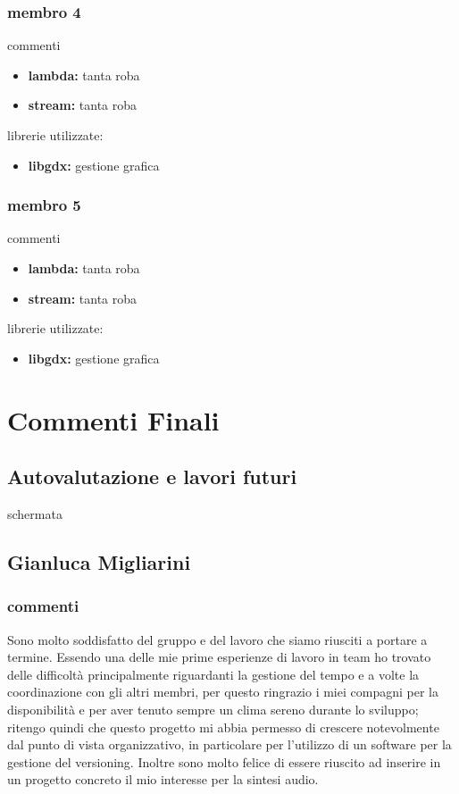 \documentclass[a4paper,12pt]{report}
\begin{document}
\subsection{membro 4}
commenti
\begin{itemize}
	\item \textbf{lambda:} tanta roba
	\item \textbf{stream:} tanta roba
\end{itemize}
librerie utilizzate:
\begin{itemize}
	\item \textbf{libgdx:} gestione grafica
\end{itemize}
\newpage

\subsection{membro 5}
commenti
\begin{itemize}
	\item \textbf{lambda:} tanta roba
	\item \textbf{stream:} tanta roba
\end{itemize}
librerie utilizzate:
\begin{itemize}
	\item \textbf{libgdx:} gestione grafica
\end{itemize}
\newpage




\chapter{Commenti Finali}
\section{Autovalutazione e lavori futuri} 
schermata 
\newpage

\section{Gianluca Migliarini}
\subsection{commenti}
Sono molto soddisfatto del gruppo e del lavoro che siamo riusciti a portare a termine.
Essendo una delle mie prime esperienze di lavoro in team ho trovato delle difficoltà principalmente riguardanti
la gestione del tempo e a volte la coordinazione con gli altri membri, per questo ringrazio i miei compagni per la disponibilità e per aver tenuto sempre un clima sereno durante lo sviluppo; ritengo quindi che questo progetto mi abbia permesso di crescere notevolmente dal punto di vista organizzativo, in particolare per l'utilizzo di un software per la gestione del versioning.
Inoltre sono molto felice di essere riuscito ad inserire in un progetto concreto il mio interesse per la sintesi audio.
\end{document}
